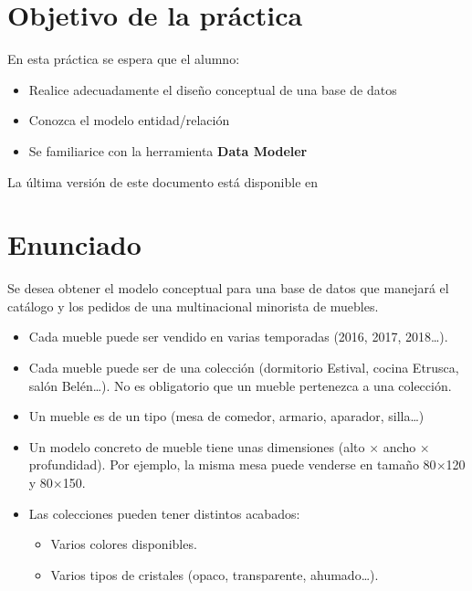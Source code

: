 

\renewcommand{\hmwkTitle}{Diseño de base de datos con \textbf{Data Modeler}}

\renewcommand{\hmwkClass}{Gestión de Base de Datos}




\primerapagina


\section{Objetivo de la práctica} En esta práctica se espera que el alumno:
\begin{itemize}
\item Realice adecuadamente el diseño conceptual de una base de datos
\item Conozca el modelo entidad/relación
\item Se familiarice con la herramienta \textbf{Data Modeler}
  
\end{itemize}

La última versión de este documento está disponible en 


\section{Enunciado}

Se desea obtener el modelo conceptual para una base de datos que manejará el catálogo y los pedidos de una multinacional minorista de muebles.
\begin{itemize}
\item Cada mueble puede ser vendido en varias temporadas (2016, 2017, 2018…).
\item Cada mueble puede ser de una colección (dormitorio Estival, cocina Etrusca, salón Belén…). No es obligatorio que un mueble pertenezca a una colección.
  
\item Un mueble es de un tipo (mesa de comedor, armario, aparador, silla\ldots)
\item Un modelo concreto de mueble tiene unas dimensiones (alto $\times$ ancho $\times$ profundidad). Por ejemplo, la misma mesa puede venderse en tamaño 80$\times$120 y 80$\times$150.
\item Las colecciones pueden tener distintos acabados:
  \begin{itemize}
  \item Varios colores disponibles.
  \item Varios tipos de cristales (opaco, transparente, ahumado…).
  \end{itemize}
\end{itemize}


